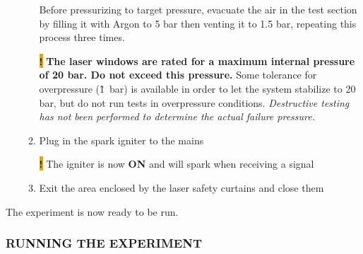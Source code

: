 \begin{enumerate}
\begin{enumerate}
    {\color{cyan} Before pressurizing to target pressure, evacuate the air in the
    test section by filling it with Argon to 5 bar then venting it to
    1.5 bar, repeating this process three times.}

    \colorbox{Goldenrod}{\textbf{!}} \textbf{The
    laser windows are rated for a maximum internal pressure of 20 bar.
    Do not exceed this
    pressure.}
    Some tolerance for overpressure (\~1~bar) is available
    in order to let the system stabilize to 20 bar, but do not run tests
    in overpressure conditions. \emph{Destructive testing has not been
    performed to determine the actual failure pressure.}
  \item
    Plug in the spark igniter to the mains

    \colorbox{Goldenrod}{\textbf{!}} The igniter is now \textbf{ON} and will spark when receiving a
    signal
  \item
    Exit the area enclosed by the laser safety curtains and close them
  \end{enumerate}
\end{enumerate}

The experiment is now ready to be run.

\subsubsection{RUNNING THE EXPERIMENT}\label{running-the-experiment}

